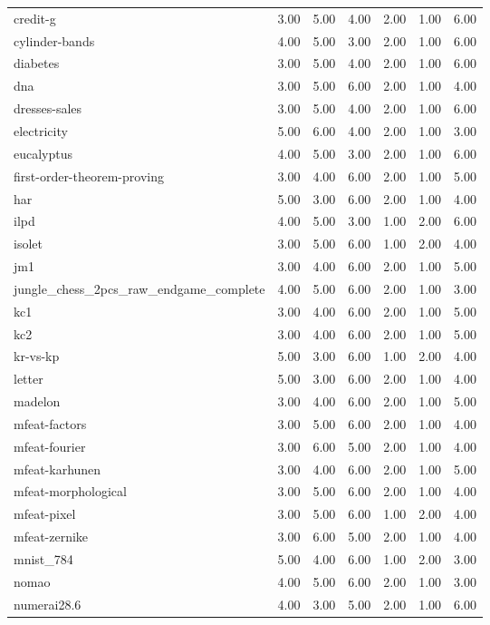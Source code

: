 \begin{table}[htbp]
\begin{tabular}{lrrrrrr}
credit-g & 3.00 & 5.00 & 4.00 & 2.00 & 1.00 & 6.00 \\
cylinder-bands & 4.00 & 5.00 & 3.00 & 2.00 & 1.00 & 6.00 \\
diabetes & 3.00 & 5.00 & 4.00 & 2.00 & 1.00 & 6.00 \\
dna & 3.00 & 5.00 & 6.00 & 2.00 & 1.00 & 4.00 \\
dresses-sales & 3.00 & 5.00 & 4.00 & 2.00 & 1.00 & 6.00 \\
electricity & 5.00 & 6.00 & 4.00 & 2.00 & 1.00 & 3.00 \\
eucalyptus & 4.00 & 5.00 & 3.00 & 2.00 & 1.00 & 6.00 \\
first-order-theorem-proving & 3.00 & 4.00 & 6.00 & 2.00 & 1.00 & 5.00 \\
har & 5.00 & 3.00 & 6.00 & 2.00 & 1.00 & 4.00 \\
ilpd & 4.00 & 5.00 & 3.00 & 1.00 & 2.00 & 6.00 \\
isolet & 3.00 & 5.00 & 6.00 & 1.00 & 2.00 & 4.00 \\
jm1 & 3.00 & 4.00 & 6.00 & 2.00 & 1.00 & 5.00 \\
jungle\_chess\_2pcs\_raw\_endgame\_complete & 4.00 & 5.00 & 6.00 & 2.00 & 1.00 & 3.00 \\
kc1 & 3.00 & 4.00 & 6.00 & 2.00 & 1.00 & 5.00 \\
kc2 & 3.00 & 4.00 & 6.00 & 2.00 & 1.00 & 5.00 \\
kr-vs-kp & 5.00 & 3.00 & 6.00 & 1.00 & 2.00 & 4.00 \\
letter & 5.00 & 3.00 & 6.00 & 2.00 & 1.00 & 4.00 \\
madelon & 3.00 & 4.00 & 6.00 & 2.00 & 1.00 & 5.00 \\
mfeat-factors & 3.00 & 5.00 & 6.00 & 2.00 & 1.00 & 4.00 \\
mfeat-fourier & 3.00 & 6.00 & 5.00 & 2.00 & 1.00 & 4.00 \\
mfeat-karhunen & 3.00 & 4.00 & 6.00 & 2.00 & 1.00 & 5.00 \\
mfeat-morphological & 3.00 & 5.00 & 6.00 & 2.00 & 1.00 & 4.00 \\
mfeat-pixel & 3.00 & 5.00 & 6.00 & 1.00 & 2.00 & 4.00 \\
mfeat-zernike & 3.00 & 6.00 & 5.00 & 2.00 & 1.00 & 4.00 \\
mnist\_784 & 5.00 & 4.00 & 6.00 & 1.00 & 2.00 & 3.00 \\
nomao & 4.00 & 5.00 & 6.00 & 2.00 & 1.00 & 3.00 \\
numerai28.6 & 4.00 & 3.00 & 5.00 & 2.00 & 1.00 & 6.00 \\

\end{tabular}
\end{table}
